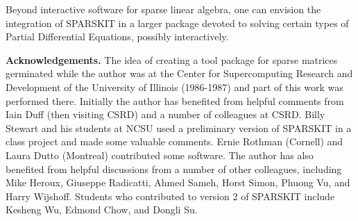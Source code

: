 Beyond interactive software for sparse linear algebra, one can
envision the integration of SPARSKIT in a larger package 
devoted to solving certain types of Partial Differential Equations, 
possibly interactively. 

\vskip 1.3in
\noindent
{\bf Acknowledgements.} The idea of creating a tool package for
sparse matrices germinated while the author was at the Center for 
Supercomputing Research and Development of the University of Illinois
(1986-1987) and part of this work was performed there. 
Initially the author has benefited from helpful comments from Iain Duff
(then visiting CSRD) and a number of colleagues at CSRD.  
Billy Stewart and his students at NCSU used a preliminary version of 
SPARSKIT in a class project and made some
valuable comments. Ernie Rothman (Cornell) and
Laura Dutto (Montreal) contributed some software.
The author has also benefited from helpful discussions
from a number of other colleagues, including 
Mike Heroux, Giuseppe Radicatti, Ahmed Sameh, Horst Simon, 
Phuong Vu, and Harry Wijshoff.  Students who contributed to
version 2 of SPARSKIT include Kesheng Wu, Edmond Chow, and Dongli Su.


